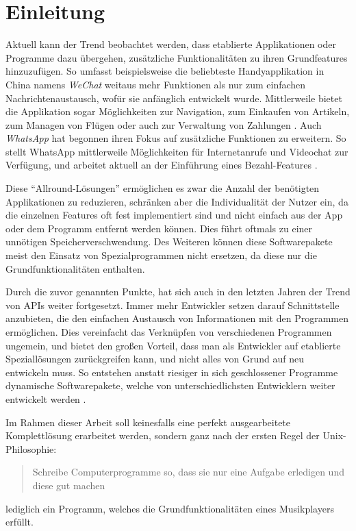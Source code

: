 
\chapter{Einleitung}
Aktuell kann der Trend beobachtet werden, dass etablierte Applikationen oder
Programme dazu übergehen, zusätzliche Funktionalitäten zu ihren Grundfeatures
hinzuzufügen. So umfasst beispielsweise die beliebteste Handyapplikation in China namens
\textit{WeChat} weitaus mehr Funktionen als nur zum einfachen
Nachrichtenaustausch, wofür sie anfänglich entwickelt wurde. Mittlerweile
bietet die Applikation sogar Möglichkeiten zur Navigation, zum
Einkaufen von Artikeln, zum Managen von Flügen oder auch zur Verwaltung von
Zahlungen \autocite{was_ist_wechat?_2019}. Auch \textit{WhatsApp} hat begonnen ihren
Fokus auf zusätzliche Funktionen zu erweitern. So stellt WhatsApp mittlerweile
Möglichkeiten für Internetanrufe und Videochat zur Verfügung, und arbeitet
aktuell an der Einführung eines Bezahl-Features \autocite{shead_2019}. \hfill


Diese \enquote{Allround-Lösungen} \space ermöglichen es zwar die Anzahl der
benötigten Applikationen zu reduzieren, schränken aber die Individualität der
Nutzer ein, da die einzelnen Features oft fest implementiert sind und nicht
einfach aus der App oder dem Programm entfernt werden können. Dies führt
oftmals zu einer unnötigen Speicherverschwendung. Des Weiteren können diese
Softwarepakete meist den Einsatz von Spezialprogrammen nicht ersetzen, da diese
nur die Grundfunktionalitäten enthalten. \hfill


Durch die zuvor genannten Punkte, hat sich auch in den letzten Jahren der Trend
von \acp{API} weiter fortgesetzt. Immer mehr Entwickler setzen darauf
Schnittstelle anzubieten, die den einfachen Austausch von Informationen mit den
Programmen ermöglichen. Dies vereinfacht das Verknüpfen von verschiedenen
Programmen ungemein, und bietet den großen Vorteil, dass man als Entwickler auf
etablierte Speziallösungen zurückgreifen kann, und nicht alles von Grund auf
neu entwickeln muss. So entstehen anstatt riesiger in sich geschlossener Programme
dynamische Softwarepakete, welche von unterschiedlichsten Entwicklern weiter
entwickelt werden \autocite{babati_2018} \autocite{sandoval_2018}. \hfill \break

Im Rahmen dieser Arbeit soll keinesfalls eine perfekt ausgearbeitete
Komplettlösung erarbeitet werden, sondern ganz nach der ersten Regel der
Unix-Philosophie:
\begin{quote}
\glqq Schreibe Computerprogramme so, dass sie nur eine Aufgabe erledigen und diese gut machen\grqq \autocite{gancarz_1997}
\end{quote}
lediglich ein Programm, welches die Grundfunktionalitäten eines Musikplayers erfüllt.


